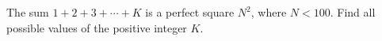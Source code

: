 The sum $1+2+3+\cdots+K$ is a perfect square $N^2$, where $N<100$. Find all possible values of the positive integer $K$.
